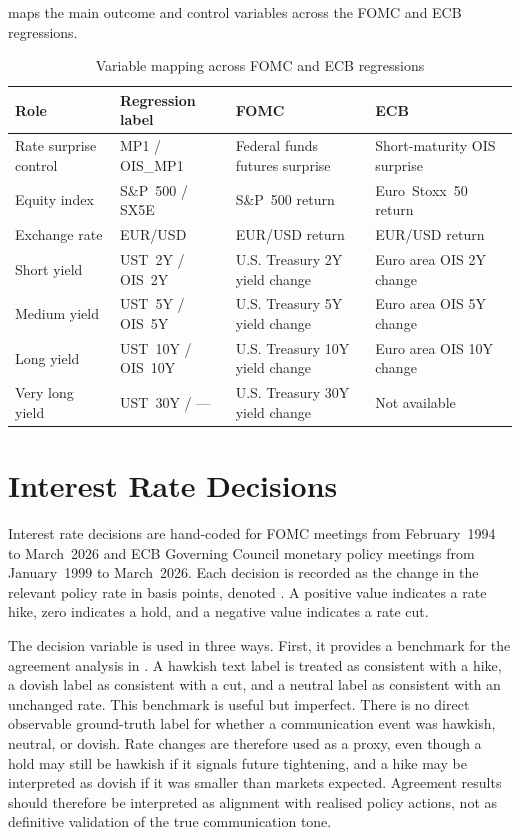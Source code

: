  maps the main outcome and control variables across the FOMC
and ECB regressions.

\begin{table}[htbp]
\centering
\caption{Variable mapping across FOMC and ECB regressions}
\label{tab:variable_map}
\small
\begin{tabularx}{\textwidth}{@{} l l X X @{} }
\toprule
Role & Regression label & FOMC & ECB \\
\midrule
Rate surprise control & MP1 / OIS\_MP1
  & Federal funds futures surprise
  & Short-maturity OIS surprise \\
Equity index & S\&P~500 / SX5E
  & S\&P~500 return
  & Euro~Stoxx~50 return \\
Exchange rate & EUR/USD
  & EUR/USD return
  & EUR/USD return \\
Short yield & UST~2Y / OIS~2Y
  & U.S. Treasury 2Y yield change
  & Euro area OIS 2Y change \\
Medium yield & UST~5Y / OIS~5Y
  & U.S. Treasury 5Y yield change
  & Euro area OIS 5Y change \\
Long yield & UST~10Y / OIS~10Y
  & U.S. Treasury 10Y yield change
  & Euro area OIS 10Y change \\
Very long yield & UST~30Y / ---
  & U.S. Treasury 30Y yield change
  & Not available \\
\bottomrule
\end{tabularx}
\end{table}


\section{Interest Rate Decisions}
\label{sec:data_rates}

Interest rate decisions are hand-coded for FOMC meetings from
February~1994 to March~2026 and ECB Governing Council monetary policy
meetings from January~1999 to March~2026. Each decision is recorded as
the change in the relevant policy rate in basis points, denoted
\bpschange{}. A positive value indicates a rate hike, zero indicates a
hold, and a negative value indicates a rate cut.

The decision variable is used in three ways. First, it provides a
benchmark for the agreement analysis in . A
hawkish text label is treated as consistent with a hike, a dovish label
as consistent with a cut, and a neutral label as consistent with an
unchanged rate. This benchmark is useful but imperfect. There is no
direct observable ground-truth label for whether a communication event
was hawkish, neutral, or dovish. Rate changes are therefore used as a
proxy, even though a hold may still be hawkish if it signals future
tightening, and a hike may be interpreted as dovish if it was smaller
than markets expected. Agreement results should therefore be interpreted
as alignment with realised policy actions, not as definitive validation
of the true communication tone.

